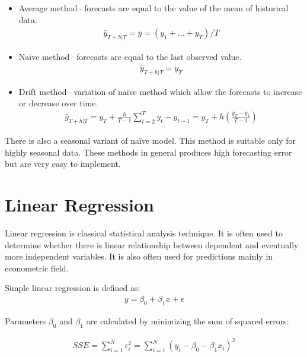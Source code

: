     \begin{itemize}
        \item Average method\,--\,forecasts are equal to the value of the mean of
            historical data.
            \begin{eqnarray}
                \hat{y}_{T+h|T} = \overline{y} = (y_{1}+ \dots + y_{T}) / T 
            \end{eqnarray}
        \item Na\"{i}ve method\,--\,forecasts are equal to the last observed value.
            \begin{eqnarray}
                \hat{y}_{T+h|T} = y_{T}
            \end{eqnarray}
        \item Drift method\,--\,variation of na\"{i}ve method which allow the
            forecasts to increase or decrease over time.
            \begin{eqnarray}
                \hat{y}_{T+h|T} = y_{T} + \frac{h}{T-1} \sum_{t=2}^T{y_{t} - y_{t-1}} = 
                    y_{T} + h(\frac{y_{T}-y_{1}}{T-1}) 
            \end{eqnarray}

    \end{itemize}
    There is also a seasonal variant of na\"{i}ve model. This method is suitable only
    for highly seasonal data. These methods in general produces high forecasting error 
    but are very easy to implement.

    \section{Linear Regression}
    Linear regression is classical statistical analysis technique. It is often used to
    determine whether there is linear relationship between dependent and eventually more
    independent variables. It is also often used for predictions mainly in econometric
    field. 

    Simple linear regression is defined as:
    \begin{eqnarray}
        y = \beta_0 + \beta_1 x + \epsilon
    \end{eqnarray}

    Parameters $\beta_0$ and $\beta_1$ are calculated by minimizing the sum of squared
    errors:
    
    \begin{eqnarray}
        SSE = \sum_{i=1}^N \epsilon_{i}^2 = \sum_{i=1}^N (y_i - \beta_0 - \beta_1 x_i)^2
    \end{eqnarray}
    
